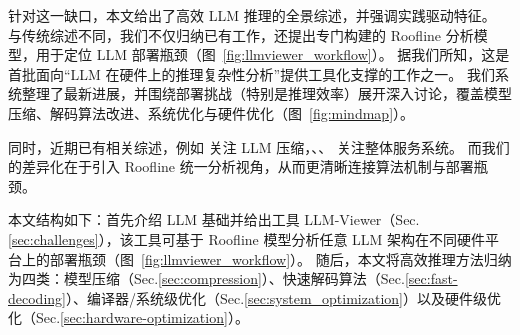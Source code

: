 针对这一缺口，本文给出了高效 LLM 推理的全景综述，并强调实践驱动特征。
与传统综述不同，我们不仅归纳已有工作，还提出专门构建的 Roofline 分析模型，用于定位 LLM 部署瓶颈（图~\ref{fig:llmviewer_workflow}）。
据我们所知，这是首批面向“LLM 在硬件上的推理复杂性分析”提供工具化支撑的工作之一。
我们系统整理了最新进展，并围绕部署挑战（特别是推理效率）展开深入讨论，覆盖模型压缩、解码算法改进、系统优化与硬件优化（图~\ref{fig:mindmap}）。

同时，近期已有相关综述，例如 \citep{zhu2023survey} 关注 LLM 压缩，\citep{miao2023towards}、\citep{ding2023efficiency}、\citep{wang2024model} 关注整体服务系统。
而我们的差异化在于引入 Roofline 统一分析视角，从而更清晰连接算法机制与部署瓶颈。

本文结构如下：首先介绍 LLM 基础并给出工具 LLM-Viewer（Sec.\ref{sec:challenges}），该工具可基于 Roofline 模型分析任意 LLM 架构在不同硬件平台上的部署瓶颈（图~\ref{fig:llmviewer_workflow}）。
随后，本文将高效推理方法归纳为四类：模型压缩（Sec.\ref{sec:compression}）、快速解码算法（Sec.\ref{sec:fast-decoding}）、编译器/系统级优化（Sec.\ref{sec:system_optimization}）以及硬件级优化（Sec.\ref{sec:hardware-optimization}）。
